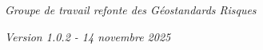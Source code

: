 \documentclass[a4paper,12pt]{article}
\begin{document}
\begin{titlepage}
    \vfill

    {\marianne\small\itshape Groupe de travail refonte des Géostandards Risques\par}
    \vspace{0.3cm}
    {\marianne\small\itshape Version 1.0.2 - 14 novembre 2025\par}



\end{titlepage}

\newpage
\thispagestyle{empty}
\mbox{}
\newpage
\end{document}
